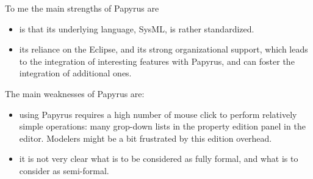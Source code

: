 \begin{assessor1}
To me the main strengths of Papyrus are
\begin{itemize}
\item is that its underlying language, SysML, is rather standardized. 
\item its reliance on the Eclipse, and its strong organizational support, which leads to the integration of interesting features with Papyrus, and can foster the integration of additional ones. 
\end{itemize}

The main weaknesses of Papyrus are: 
\begin{itemize}
\item using Papyrus requires a high number of mouse click to perform relatively simple operations: many grop-down lists in the property edition panel in the editor. Modelers might be a bit frustrated by this edition overhead. 
\item it is not very clear what is to be considered as fully formal, and what is to consider as semi-formal.  
\end{itemize}
\end{assessor1}

